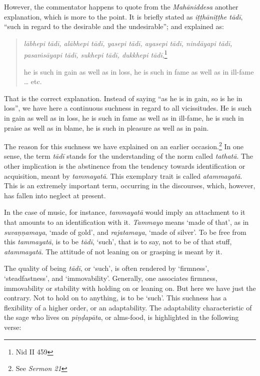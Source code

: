 However, the commentator happens to quote from the \emph{Mahāniddesa} another explanation, which is more to the point. It is briefly stated as \emph{iṭṭhāniṭṭhe tādī}, ``such in regard to the desirable and the undesirable''; and explained as:

\begin{quote}
\emph{lābhepi tādī, alābhepi tādī, yasepi tādī, ayasepi tādī, nindāyapi tādī, pasaṁsāyapi tādī, sukhepi tādī, dukkhepi tādī},\footnote{Nid II 459}

he is such in gain as well as in loss, he is such in fame as well as in ill-fame \ldots{} etc.
\end{quote}

That is the correct explanation. Instead of saying ``as he is in gain, so is he in loss'', we have here a continuous suchness in regard to all vicissitudes. He is such in gain as well as in loss, he is such in fame as well as in ill-fame, he is such in praise as well as in blame, he is such in pleasure as well as in pain.

The reason for this suchness we have explained on an earlier occasion.\footnote{See \emph{Sermon 21}} In one sense, the term \emph{tādī} stands for the understanding of the norm called \emph{tathatā}. The other implication is the abstinence from the tendency towards identification or acquisition, meant by \emph{tammayatā}. This exemplary trait is called \emph{atammayatā}. This is an extremely important term, occurring in the discourses, which, however, has fallen into neglect at present.

In the case of music, for instance, \emph{tammayatā} would imply an attachment to it that amounts to an identification with it. \emph{Tammayo} means `made of that', as in \emph{suvaṇṇamaya}, `made of gold', and \emph{rajatamaya}, `made of silver'. To be free from this \emph{tammayatā}, is to be \emph{tādī}, `such', that is to say, not to be of that stuff, \emph{atammayatā}. The attitude of not leaning on or grasping is meant by it.

The quality of being \emph{tādī}, or `such', is often rendered by `firmness', `steadfastness', and `immovability'. Generally, one associates firmness, immovability or stability with holding on or leaning on. But here we have just the contrary. Not to hold on to anything, is to be `such'. This suchness has a flexibility of a higher order, or an adaptability. The adaptability characteristic of the sage who lives on \emph{piṇḍapāta}, or alms-food, is highlighted in the following verse:

